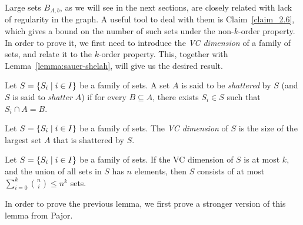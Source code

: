     Large sets $B_{A,b}$, as we will see in the next sections, are closely related with lack of regularity in the graph.
    A useful tool to deal with them is Claim~\ref{claim_2.6}, which gives a bound on the number of such sets under the
    non-$k$-order property.
    In order to prove it, we first need to introduce the \emph{VC dimension} of a family of sets, and relate it to the
    $k$-order property.
    This, together with Lemma~\ref{lemma:sauer-shelah}, will give us the desired result.

    \label{def:shattered}
        Let $S = \left\{ S_i \mid i \in I \right\}$ be a family of sets.
        A set $A$ is said to be \emph{shattered} by $S$ (and $S$ is said to \emph{shatter} $A$) if
        for every $B \subseteq A$, there exists $S_i \in S$ such that $S_i \cap A = B$.

    \label{def:VC_dimension}
        Let $S = \left\{ S_i \mid i \in I \right\}$ be a family of sets.
        The \emph{VC dimension} of $S$ is the size of the largest set $A$ that is shattered by $S$.

    \label{lemma:sauer-shelah}
        Let $S = \left\{ S_i \mid i \in I \right\}$ be a family of sets.
        If the VC dimension of $S$ is at most $k$, and the union of all sets in $S$ has $n$ elements, then
        $S$ consists of at most $\sum_{i=0}^{k} \binom{n}{i} \leq n^k$ sets.
        \newline

        In order to prove the previous lemma, we first prove a stronger version of this lemma from Pajor.

